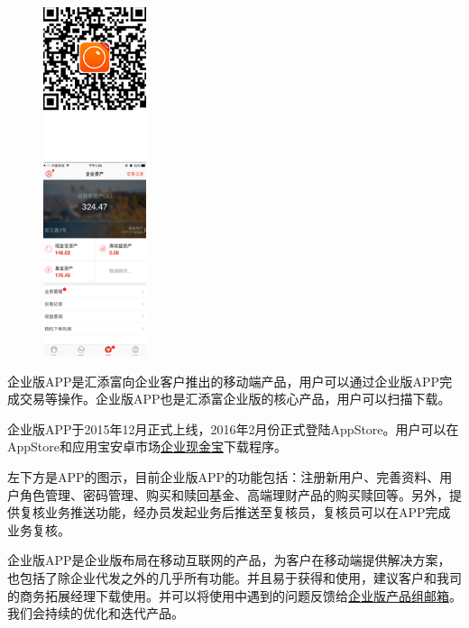 \begin{figure}
	\includegraphics[width=0.27\textwidth]{picture/app_home.png}
	\label{fig:app_home}
\end{figure}

企业版APP是汇添富向企业客户推出的移动端产品，用户可以通过企业版APP完成交易等操作。企业版APP也是汇添富企业版的核心产品，用户可以扫描\hyperref[fig:app_home]{}下载。\par

企业版APP于2015年12月正式上线，2016年2月份正式登陆AppStore。用户可以在AppStore和应用宝安卓市场\href{http://sj.qq.com/myapp/detail.htm?apkName=com.fund.instmobile}{企业现金宝}下载程序。\par

左下方是APP的图示，目前企业版APP的功能包括：注册新用户、完善资料、用户角色管理、密码管理、购买和赎回基金、高端理财产品的购买赎回等。另外，提供复核业务推送功能，经办员发起业务后推送至复核员，复核员可以在APP完成业务复核。\par

企业版APP是企业版布局在移动互联网的产品，为客户在移动端提供解决方案，也包括了除企业代发之外的几乎所有功能。并且易于获得和使用，建议客户和我司的商务拓展经理下载使用。并可以将使用中遇到的问题反馈给\href{mailto:zhengyouxin@htffund.com}{企业版产品组邮箱}。我们会持续的优化和迭代产品。
